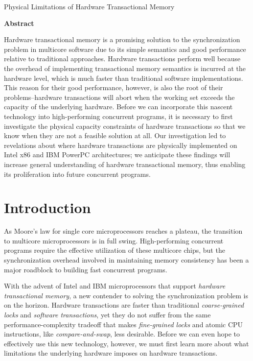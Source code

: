 \documentclass{article}
\begin{document}
\newcommand{\figuretitle}[1]{\textbf{#1}\\\vspace{2mm}}

\begin{center}
{\huge Physical Limitations of Hardware Transactional Memory}
\end{center}

\begin{center}
\begin{minipage}{.9\textwidth}
\begin{center}
{\large \textbf{Abstract}}
\end{center}
Hardware transactional memory is a promising solution to the synchronization
problem in multicore software due to its simple semantics and good performance
relative to traditional approaches.
Hardware transactions perform well because the overhead of implementing
transactional memory semantics is incurred at the hardware level, which is much
faster than traditional software implementations.
This reason for their good performance, however, is also the root of their
problems--hardware transactions will abort when the working set exceeds the
capacity of the underlying hardware.
Before we can incorporate this nascent technology into high-performing
concurrent programs, it is necessary to first investigate the physical capacity
constraints of hardware transactions so that we know when they are not a
feasible solution at all.
Our investigation led to revelations about where hardware transactions are
physically implemented on Intel x86 and IBM PowerPC architectures; we anticipate
these findings will increase general understanding of hardware transactional
memory, thus enabling its proliferation into future concurrent programs.
\end{minipage}
\end{center}

\section{Introduction}
As Moore's law for single core microprocessors reaches a plateau, the transition
to multicore microprocessors is in full swing. High-performing concurrent
programs require the effective utilization of these multicore chips, but the
synchronization overhead involved in maintaining memory consistency has been a
major roadblock to building fast concurrent programs.

With the advent of Intel and IBM microprocessors that support \textit{hardware
transactional memory}, a new contender to solving the synchronization problem is
on the horizon. Hardware transactions are faster than traditional
\textit{coarse-grained locks} and \textit{software transactions}, yet they do
not suffer from the same performance-complexity tradeoff that makes
\textit{fine-grained locks} and atomic CPU instructions, like
\textit{compare-and-swap}, less desirable. Before we can even hope to
effectively use this new technology, however, we must first learn more about
what limitations the underlying hardware imposes on hardware transactions.
\end{document}
